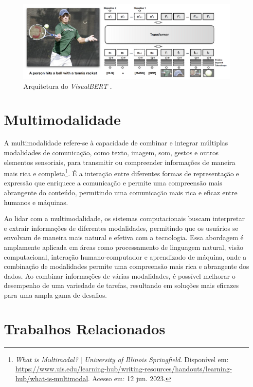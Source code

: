 \begin{figure}[!htbp]
	\centering
	\includegraphics[scale=0.35]{imagens/visualBERT.png}
    \caption {Arquitetura do \textit{VisualBERT} \cite{VisualBERTArt}.}
\end{figure}

\section{Multimodalidade}

A multimodalidade refere-se à capacidade de combinar e integrar múltiplas modalidades de comunicação, como texto, imagem, som, gestos e outros elementos sensoriais, para transmitir ou compreender informações de maneira mais rica e completa\footnote{\textit{What is Multimodal?} | \textit{University of Illinois Springfield}. Disponível em: \url{https://www.uis.edu/learning-hub/writing-resources/handouts/learning-hub/what-is-multimodal}. Acesso em: 12 jun. 2023.}. É a interação entre diferentes formas de representação e expressão que enriquece a comunicação e permite uma compreensão mais abrangente do conteúdo, permitindo uma comunicação mais rica e eficaz entre humanos e máquinas.

Ao lidar com a multimodalidade, os sistemas computacionais buscam interpretar e extrair informações de diferentes modalidades, permitindo que os usuários se envolvam de maneira mais natural e efetiva com a tecnologia. Essa abordagem é amplamente aplicada em áreas como processamento de linguagem natural, visão computacional, interação humano-computador e aprendizado de máquina, onde a combinação de modalidades permite uma compreensão mais rica e abrangente dos dados. Ao combinar informações de várias modalidades, é possível melhorar o desempenho de uma variedade de tarefas, resultando em soluções mais eficazes para uma ampla gama de desafios.

\section{Trabalhos Relacionados}

